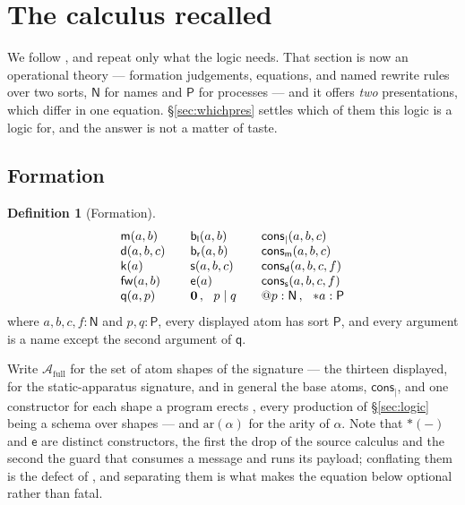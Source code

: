 \documentclass[11pt]{article}
\makeatletter
\theoremstyle{plain}
\theoremstyle{definition}
\newtheorem{definition}[theorem]{Definition}
\theoremstyle{remark}
\newcommand{\quo}[1]{@#1}
\newcommand{\drp}[1]{{*}#1}
\newcommand{\nil}{\mathbf{0}}
\newcommand{\mm}{\mathsf{m}}
\newcommand{\dd}{\mathsf{d}}
\newcommand{\kk}{\mathsf{k}}
\newcommand{\fw}{\mathsf{fw}}
\newcommand{\bl}{\mathsf{b}_{\mathsf{l}}}
\newcommand{\br}{\mathsf{b}_{\mathsf{r}}}
\newcommand{\sy}{\mathsf{s}}
\newcommand{\ev}{\mathsf{e}}
\newcommand{\qq}{\mathsf{q}}
\newcommand{\cons}{\mathsf{cons}}
\newcommand{\consp}{\cons_{\mid}}
\newcommand{\consm}{\cons_{\mm}}
\newcommand{\consd}{\cons_{\dd}}
\newcommand{\conss}{\cons_{\sy}}
\newcommand{\Atm}{\mathcal{A}}
\makeatother
\begin{document}
\section{The calculus recalled}
\label{sec:calc}

We follow \cite[\S3]{rhocomb3}, and repeat only what the logic needs. That
section is now an operational theory --- formation judgements, equations, and
named rewrite rules over two sorts, $\mathsf{N}$ for names and $\mathsf{P}$
for processes --- and it offers \emph{two} presentations, which differ in one
equation. \S\ref{sec:whichpres} settles which of them this logic is a logic
for, and the answer is not a matter of taste.

\subsection{Formation}

\begin{definition}[Formation]
\label{def:syntax}
\[
\begin{array}{l@{\qquad}l@{\qquad}l}
 \mm(a,b) & \bl(a,b) & \consp(a,b,c)\\
 \dd(a,b,c) & \br(a,b) & \consm(a,b,c)\\
 \kk(a) & \sy(a,b,c) & \consd(a,b,c,f)\\
 \fw(a,b) & \ev(a) & \conss(a,b,c,f)\\
 \qq(a,p) & \nil \,,\ \ p \mid q & \quo{p} : \mathsf{N} \,,\ \ \drp{a} : \mathsf{P}
\end{array}
\]
where $a,b,c,f : \mathsf{N}$ and $p,q : \mathsf{P}$, every displayed atom has
sort $\mathsf{P}$, and every argument is a name except the second argument of
$\qq$.
\end{definition}

Write $\Atm_{\mathrm{full}}$ for the set of atom shapes of the signature ---
the thirteen displayed, for the static-apparatus signature, and in general the
base atoms, $\consp$, and one constructor for each shape a program erects
\cite[Def.~3.8]{rhocomb3}, every production of \S\ref{sec:logic} being a
schema over shapes --- and
$\mathrm{ar}(\alpha)$ for the arity of $\alpha$. Note that $\drp{(-)}$ and
$\ev$ are distinct constructors, the first the drop of the source calculus and
the second the guard that consumes a message and runs its payload; conflating
them is the defect of \cite[Prop.~3.5]{rhocomb3}, and separating them is what
makes the equation below optional rather than fatal.
\end{document}

